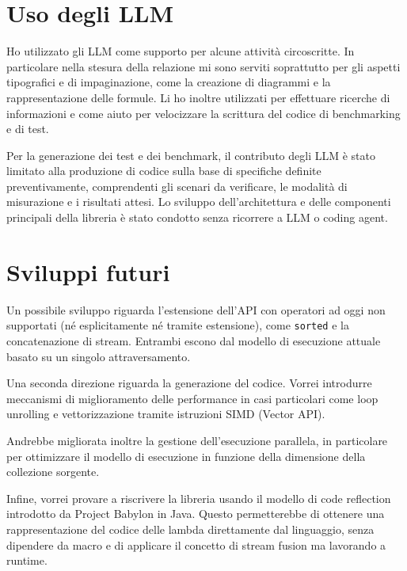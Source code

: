 \documentclass[a4paper,11pt]{report}
\theoremstyle{definition}
\begin{document}
\section{Uso degli LLM}
\label{sec:uso-llm}

Ho utilizzato gli LLM come supporto per alcune attività circoscritte. In particolare nella stesura della relazione mi sono serviti soprattutto per gli aspetti tipografici e di impaginazione, come la creazione di diagrammi e la rappresentazione delle formule. Li ho inoltre utilizzati per effettuare ricerche di informazioni e come aiuto per velocizzare la scrittura del codice di benchmarking e di test.

Per la generazione dei test e dei benchmark, il contributo degli LLM è stato limitato alla produzione di codice sulla base di specifiche definite preventivamente, comprendenti gli scenari da verificare, le modalità di misurazione e i risultati attesi. Lo sviluppo dell'architettura e delle componenti principali della libreria è stato condotto senza ricorrere a LLM o coding agent.
\section{Sviluppi futuri}
\label{sec:sviluppi-futuri}

Un possibile sviluppo riguarda l'estensione dell'API con operatori ad oggi non supportati (né esplicitamente né tramite estensione), come \texttt{sorted} e la concatenazione di stream. Entrambi escono dal modello di esecuzione attuale basato su un singolo attraversamento.

Una seconda direzione riguarda la generazione del codice. Vorrei introdurre meccanismi di miglioramento delle performance in casi particolari come loop unrolling e vettorizzazione tramite istruzioni SIMD (Vector API).

Andrebbe migliorata inoltre la gestione dell'esecuzione parallela, in particolare per ottimizzare il modello di esecuzione in funzione della dimensione della collezione sorgente.

Infine, vorrei provare a riscrivere la libreria usando il modello di code reflection introdotto da Project Babylon in Java. Questo permetterebbe di ottenere una rappresentazione del codice delle lambda direttamente dal linguaggio, senza dipendere da macro e di applicare il concetto di stream fusion ma lavorando a runtime.


\end{document}
